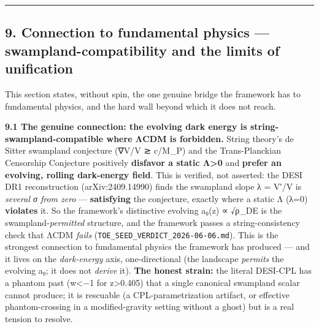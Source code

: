 \documentclass[
]{article}
\begin{document}
\begin{center}\rule{0.5\linewidth}{0.5pt}\end{center}

\subsection{9. Connection to fundamental physics ---
swampland-compatibility and the limits of
unification}\label{connection-to-fundamental-physics-swampland-compatibility-and-the-limits-of-unification}

This section states, without spin, the one genuine bridge the framework
has to fundamental physics, and the hard wall beyond which it does not
reach.

\textbf{9.1 The genuine connection: the evolving dark energy is
string-swampland-compatible where ΛCDM is forbidden.} String theory's de
Sitter swampland conjecture (\textbar∇V\textbar/V ≳ c/M\_P) and the
Trans-Planckian Censorship Conjecture positively \textbf{disfavor a
static Λ\textgreater0} and \textbf{prefer an evolving, rolling
dark-energy field}. This is verified, not asserted: the DESI DR1
reconstruction (arXiv:2409.14990) finds the swampland slope λ =
\textbar V′\textbar/V is \emph{several σ from zero} ---
\textbf{satisfying} the conjecture, exactly where a static Λ (λ=0)
\textbf{violates} it. So the framework's distinctive evolving a₀(z) ∝
√ρ\_DE is the swampland-\emph{permitted} structure, and the framework
passes a string-consistency check that ΛCDM \emph{fails}
(\texttt{TOE\_SEED\_VERDICT\_2026-06-06.md}). This is the strongest
connection to fundamental physics the framework has produced --- and it
lives on the \emph{dark-energy} axis, one-directional (the landscape
\emph{permits} the evolving a₀; it does not \emph{derive} it).
\textbf{The honest strain:} the literal DESI-CPL has a phantom past
(w\textless−1 for z\textgreater0.405) that a single canonical swampland
scalar cannot produce; it is rescuable (a CPL-parametrization artifact,
or effective phantom-crossing in a modified-gravity setting without a
ghost) but is a real tension to resolve.
\end{document}
